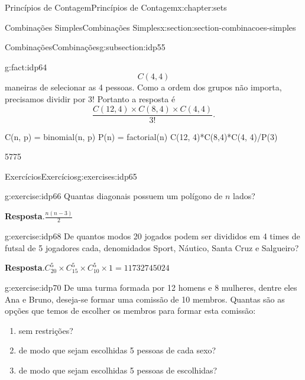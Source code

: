 \documentclass[oneside,10pt,]{book}
\newcommand{\blocktitlefont}{\relax}
\numberwithin{equation}{section}
\begin{document}
\begin{chapterptx}{Princípios de Contagem}{}{Princípios de Contagem}{}{}{x:chapter:sets}
\begin{sectionptx}{Combinações Simples}{}{Combinações Simples}{}{}{x:section:section-combinacoes-simples}
\begin{subsectionptx}{Combinações}{}{Combinações}{}{}{g:subsection:idp55}
\begin{fact}{}{}{g:fact:idp64}
\begin{equation*}
C(4,4) 
\end{equation*}
maneiras de selecionar as 4 pessoas. Como a ordem dos grupos não importa, precisamos dividir por \(3!\) Portanto a resposta é%
\begin{equation*}
\frac{C(12, 4)\times C(8, 4)\times C(4, 4)}{3!}.
\end{equation*}
%
\begin{sageinput}
C(n, p) = binomial(n, p)
P(n) = factorial(n)
C(12, 4)*C(8,4)*C(4, 4)/P(3)
\end{sageinput}
\begin{sageoutput}
5775
\end{sageoutput}
\end{fact}
\end{subsectionptx}
%
%
\typeout{************************************************}
\typeout{************************************************}
%
\begin{exercises-subsection}{Exercícios}{}{Exercícios}{}{}{g:exercises:idp65}
\begin{divisionexercise}{1}{}{}{g:exercise:idp66}%
Quantas diagonais possuem um polígono de \(n\) lados?%
\par\smallskip%
\noindent\textbf{\blocktitlefont Resposta}.\hypertarget{g:answer:idp67}{}\quad{}\(\frac{n(n-3)}{2} \)%
\end{divisionexercise}%
\begin{divisionexercise}{2}{}{}{g:exercise:idp68}%
De quantos modos 20 jogados podem ser divididos em 4 times de futsal de 5 jogadores cada, denomidados Sport, Náutico, Santa Cruz e Salgueiro?%
\par\smallskip%
\noindent\textbf{\blocktitlefont Resposta}.\hypertarget{g:answer:idp69}{}\quad{}\(C_{20}^5\times C_{15}^5\times C_{10}^5\times 1 = 11732745024 \)%
\end{divisionexercise}%
\begin{divisionexercise}{3}{}{}{g:exercise:idp70}%
De uma turma formada por 12 homens e 8 mulheres, dentre eles Ana e Bruno, deseja-se formar uma comissão de 10 membros. Quantas são as opções que temos de escolher os membros para formar esta comissão:%
%
\begin{multicols}{1}
\begin{enumerate}[label=(\alph*)]
\item{}sem restrições?%
\item{}de modo que sejam escolhidas 5 pessoas de cada sexo?%
\item{}de modo que sejam escolhidas 5 pessoas de escolhidas?%

\end{enumerate}
\end{multicols}
\end{divisionexercise}
\end{exercises-subsection}
\end{sectionptx}
\end{chapterptx}
\end{document}
